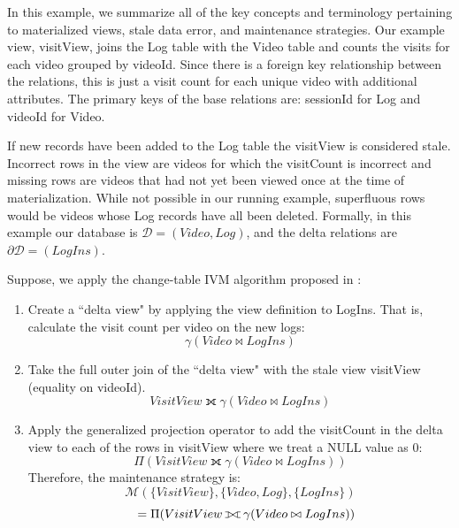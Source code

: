\vspace{0.25em}

\begin{example}\label{concepts}
In this example, we summarize all of the key concepts and terminology pertaining to materialized views, stale data error, and maintenance strategies.
Our example view, visitView, joins the Log table with the Video table and counts the visits for each video grouped by videoId.
Since there is a foreign key relationship between the relations, this is just a visit count for each unique video with additional attributes. 
The primary keys of the base relations are: sessionId for Log and videoId for Video.

If new records have been added to the Log table the visitView is considered stale.
Incorrect rows in the view are videos for which the visitCount is incorrect and missing rows are videos that had not yet been viewed once at the time of materialization. 
While not possible in our running example, superfluous rows would be videos whose Log records have all been deleted.
Formally, in this example our database is $\mathcal{D}=(Video, Log)$, and the delta relations are $\partial\mathcal{D}=(LogIns)$. 

Suppose, we apply the change-table IVM algorithm proposed in \cite{gupta1995maintenance}:
\vspace{-.55em}
\begin{enumerate}[noitemsep]
\item Create a ``delta view" by applying the view definition to LogIns. That is, calculate the visit count per video on the new logs:
\[
 \gamma(Video \bowtie LogIns)
\]
\item Take the full outer join of the ``delta view" with the stale view visitView (equality on videoId).
\[
 VisitView \fullouterjoin \gamma(Video \bowtie LogIns)
\]
\item Apply the generalized projection operator to add the visitCount in the delta view to each of the rows in visitView where we treat a NULL value as 0: 
\[
 \Pi (VisitView \fullouterjoin \gamma(Video \bowtie LogIns))
\]
Therefore, the maintenance strategy is:
\[
 \mathcal{M}(\{VisitView\},\{Video, Log\}, \{LogIns\})
\]
\[
\text{\hspace{0.7em}} = \Pi (VisitView \fullouterjoin \gamma(Video \bowtie LogIns))
\]
\end{enumerate}

\end{example}



